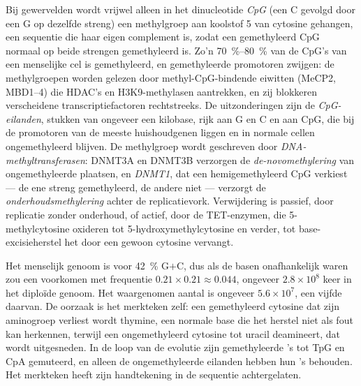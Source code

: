 \begin{definition}\label{def:b3:chromatin-epigenetics:methylation}
Bij gewervelden wordt vrijwel alleen in het dinucleotide \emph{CpG}
(een C gevolgd door een G op dezelfde streng) een methylgroep aan
koolstof 5 van cytosine gehangen, een sequentie die haar eigen
complement is, zodat een gemethyleerd CpG normaal op beide strengen
gemethyleerd is. Zo'n \qtyrange{70}{80}{\%} van de CpG's van een
menselijke cel is gemethyleerd, en gemethyleerde promotoren zwijgen:
de methylgroepen worden gelezen door methyl-CpG-bindende eiwitten
(MeCP2, MBD1--4) die HDAC's en H3K9-methylasen aantrekken, en zij
blokkeren verscheidene transcriptiefactoren rechtstreeks. De
uitzonderingen zijn de \emph{CpG-eilanden}, stukken van ongeveer een
kilobase, rijk aan G en C en aan CpG, die bij de promotoren van de
meeste huishoudgenen liggen en in normale cellen ongemethyleerd
blijven. De methylgroep wordt geschreven door
\emph{DNA-methyltransferasen}: DNMT3A en DNMT3B verzorgen de
\emph{de-novomethylering} van ongemethyleerde plaatsen, en
\emph{DNMT1}, dat een hemigemethyleerd CpG verkiest --- de ene streng
gemethyleerd, de andere niet --- verzorgt de
\emph{onderhoudsmethylering} achter de replicatievork. Verwijdering is
passief, door replicatie zonder onderhoud, of actief, door de
TET-enzymen, die 5-methylcytosine oxideren tot
5-hydroxymethylcytosine en verder, tot base-excisieherstel het door
een gewoon cytosine vervangt.
\end{definition}

\begin{example}\label{ex:b3:chromatin-epigenetics:cpg-deficit}
Het menselijk genoom is voor \qty{42}{\%} G$+$C, dus als de basen
onafhankelijk waren zou een  voorkomen met frequentie
$0.21\times 0.21 \approx 0.044$, ongeveer $2.8\times 10^{8}$ keer in
het diploïde genoom. Het waargenomen aantal is ongeveer
$5.6\times 10^{7}$, een vijfde daarvan. De oorzaak is het merkteken
zelf: een gemethyleerd cytosine dat zijn aminogroep verliest wordt
thymine, een normale base die het herstel niet als fout kan herkennen,
terwijl een ongemethyleerd cytosine tot uracil deamineert, dat wordt
uitgesneden. In de loop van de evolutie zijn gemethyleerde 's tot
TpG en CpA gemuteerd, en alleen de ongemethyleerde eilanden hebben hun
's behouden. Het merkteken heeft zijn handtekening in de sequentie
achtergelaten.
\end{example}

